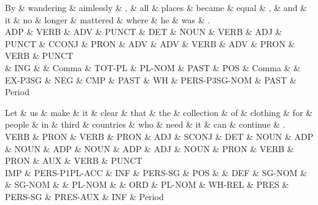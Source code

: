 \begin{dependency}
\begin{deptext}
By \& wandering \& aimlessly \& , \& all \& places \& became \& equal \& , \& and \& it \& no \& longer \& mattered \& where \& he \& was \& . \\
ADP \& VERB \& ADV \& PUNCT \& DET \& NOUN \& VERB \& ADJ \& PUNCT \& CCONJ \& PRON \& ADV \& ADV \& VERB \& ADV \& PRON \& VERB \& PUNCT \\
 \& ING \&  \& Comma \& TOT-PL \& PL-NOM \& PAST \& POS \& Comma \&  \& EX-P3SG \& NEG \& CMP \& PAST \& WH \& PERS-P3SG-NOM \& PAST \& Period \\
\end{deptext}



\end{dependency}

\begin{dependency}
\begin{deptext}
Let \& us \& make \& it \& clear \& that \& the \& collection \& of \& clothing \& for \& people \& in \& third \& countries \& who \& need \& it \& can \& continue \& . \\
VERB \& PRON \& VERB \& PRON \& ADJ \& SCONJ \& DET \& NOUN \& ADP \& NOUN \& ADP \& NOUN \& ADP \& ADJ \& NOUN \& PRON \& VERB \& PRON \& AUX \& VERB \& PUNCT \\
IMP \& PERS-P1PL-ACC \& INF \& PERS-SG \& POS \&  \& DEF \& SG-NOM \&  \& SG-NOM \&  \& PL-NOM \&  \& ORD \& PL-NOM \& WH-REL \& PRES \& PERS-SG \& PRES-AUX \& INF \& Period \\
\end{deptext}



\end{dependency}

